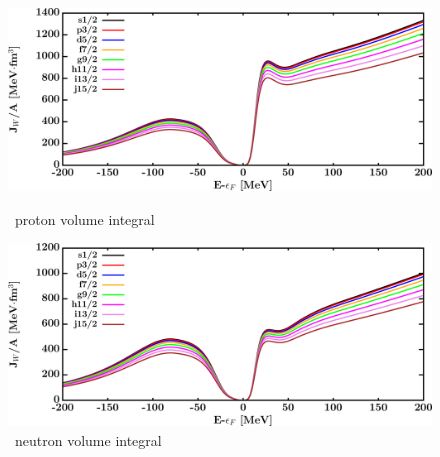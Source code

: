 \begin{figure}[hbtp]
    \centering
    \begin{minipage}{0.42\textwidth}
        \centering
        \includegraphics[width=\textwidth]{figures/pb208_protonVolumeIntegrals.png}
        \caption*{\pbEight\ proton volume integral}
        \label{DOMFitData_pb208_proton_potentialIntegral}
    \end{minipage}\hspace{6pt}
    \begin{minipage}{0.42\textwidth}
        \centering
        \includegraphics[width=\textwidth]{figures/pb208_neutronVolumeIntegrals.png}
        \caption*{\pbEight\ neutron volume integral}
        \label{DOMFitData_pb208_neutron_potentialIntegral}
    \end{minipage}
\end{figure}
